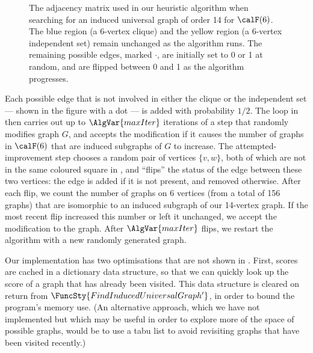 \begin{figure}[h!]
    \centering
    \footnotesize
    \caption{The adjacency matrix used in our heuristic algorithm when searching
        for an induced universal graph of order 14 for $\calF(6)$.  The blue
        region (a 6-vertex clique) and the yellow region (a 6-vertex independent
        set) remain unchanged as the algorithm runs.  The remaining possible edges,
        marked $\boldsymbol{\cdot}$, are initially set to 0 or 1 at random,
        and are flipped between 0 and 1 as the algorithm progresses.}
\label{fig:heuristic-regions}
\end{figure}

Each possible edge that is not involved in either the clique or the independent
set --- shown in the figure with a dot --- is added with probability $1/2$.
The loop in  then carries out up to
$\AlgVar{maxIter}$ iterations of a step that randomly modifies graph $G$,
and accepts the modification if it causes the number of graphs in $\calF(6)$ that
are induced subgraphs of $G$ to increase.
The attempted-improvement step chooses a random pair of vertices $\{v, w\}$,
both of which are not in the same coloured square
in , and
``flips'' the status of the edge between these two vertices: the edge is added if it
is not present, and removed otherwise.
After each flip, we count the number of graphs on 6 vertices (from a total
of 156 graphs) that are
isomorphic to an induced subgraph of our 14-vertex graph.  If the most recent flip
increased this number or left it unchanged, we accept the modification
to the graph.  After $\AlgVar{maxIter}$
flips, we restart the algorithm with a new randomly generated graph.

Our implementation has two optimisations that are not shown in .
First, scores are cached in a dictionary data structure, so that we can quickly look
up the score of a graph that has already been visited. This data structure is
cleared on return from $\FuncSty{FindInducedUniversalGraph'}$, in order to
bound the program's memory use.
(An alternative approach, which we have not implemented but which
may be useful in order to explore more of the space of possible graphs, would be to
use a tabu list \cite{DBLP:books/daglib/0093574} to avoid revisiting graphs
that have been visited recently.)

